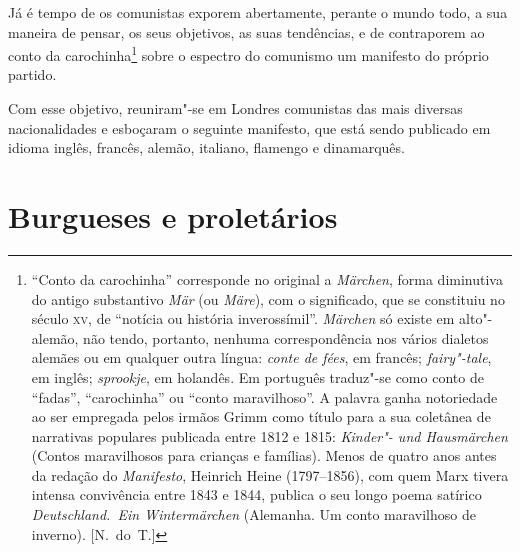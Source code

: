 Já é tempo de os comunistas exporem abertamente, perante o mundo
todo, a sua maneira de pensar, os seus objetivos, as suas tendências, e
de contraporem ao conto da carochinha\footnote{ “Conto da carochinha” corresponde no original a \textit{Märchen}, forma
diminutiva do antigo substantivo \textit{Mär} (ou \textit{Märe}), com o
significado, que se constituiu no século \textsc{xv}, de “notícia ou história
inverossímil”. \textit{Märchen} só existe em alto"-alemão, não tendo,
portanto, nenhuma correspondência  nos vários dialetos alemães ou em
qualquer outra língua: \textit{conte de fées}, em francês;
\textit{fairy"-tale}, em inglês; \textit{sprookje}, em holandês. Em
português traduz"-se como conto de “fadas”, “carochinha” ou “conto
maravilhoso”. A palavra ganha notoriedade ao ser empregada pelos irmãos
Grimm como título para a sua coletânea de narrativas populares
publicada entre 1812 e 1815: \textit{Kinder"- und Hausmärchen}
(Contos maravilhosos para crianças e famílias). Menos de quatro     \label{7}
anos antes da redação do \textit{Manifesto}, Heinrich Heine (1797--1856), com quem Marx tivera intensa convivência entre 1843 e 1844,
publica o seu longo poema satírico \textit{Deutschland.~Ein
Wintermärchen} (Alemanha. Um conto maravilhoso de inverno). [N.~do~T.]}
sobre o espectro do comunismo um manifesto do próprio partido.

Com esse objetivo, reuniram"-se em Londres comunistas das mais diversas	
nacionalidades e esboçaram o seguinte manifesto, que está sendo
publicado em idioma inglês, francês, alemão, italiano, flamengo e
dinamarquês.

\section[Burgueses e proletários]{Burgueses e proletários}


